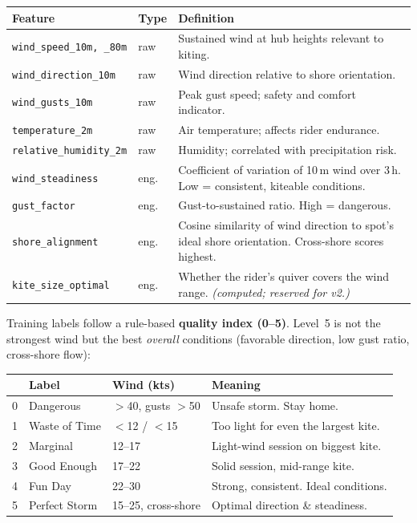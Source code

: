 \documentclass[11pt,a4paper]{article}
\begin{document}
\begin{center}
\footnotesize
\begin{tabularx}{\linewidth}{@{}l l X@{}}
\toprule
\textbf{Feature} & \textbf{Type} & \textbf{Definition} \\
\midrule
\texttt{wind\_speed\_10m, \_80m}    & raw   & Sustained wind at hub heights relevant to kiting. \\
\texttt{wind\_direction\_10m}       & raw   & Wind direction relative to shore orientation. \\
\texttt{wind\_gusts\_10m}           & raw   & Peak gust speed; safety and comfort indicator. \\
\texttt{temperature\_2m}            & raw   & Air temperature; affects rider endurance. \\
\texttt{relative\_humidity\_2m}     & raw   & Humidity; correlated with precipitation risk. \\
\addlinespace
\texttt{wind\_steadiness}           & eng.\ & Coefficient of variation of 10\,m wind over 3\,h.
  Low = consistent, kiteable conditions. \\
\texttt{gust\_factor}               & eng.\ & Gust-to-sustained ratio. High = dangerous. \\
\texttt{shore\_alignment}           & eng.\ & Cosine similarity of wind direction to spot's
  ideal shore orientation. Cross-shore scores highest. \\
\addlinespace
\texttt{kite\_size\_optimal}        & eng.\ & Whether the rider's quiver covers the wind range.
  \textit{(computed; reserved for v2.)} \\
\bottomrule
\end{tabularx}
\end{center}

\noindent
Training labels follow a rule-based \textbf{quality index (0--5)}.
Level~5 is not the strongest wind but the best \emph{overall}
conditions (favorable direction, low gust ratio, cross-shore flow):

\begin{center}
\footnotesize
\begin{tabularx}{\linewidth}{@{}c l l X@{}}
\toprule
 & \textbf{Label} & \textbf{Wind (kts)} & \textbf{Meaning} \\
\midrule
0 & Dangerous     & $>$40, gusts $>$50   & Unsafe storm. Stay home. \\
1 & Waste of Time & $<$12 / $<$15        & Too light for even the largest kite. \\
2 & Marginal      & 12--17               & Light-wind session on biggest kite. \\
3 & Good Enough   & 17--22               & Solid session, mid-range kite. \\
4 & Fun Day       & 22--30               & Strong, consistent. Ideal conditions. \\
5 & Perfect Storm & 15--25, cross-shore   & Optimal direction \& steadiness. \\
\bottomrule
\end{tabularx}
\end{center}
\end{document}
